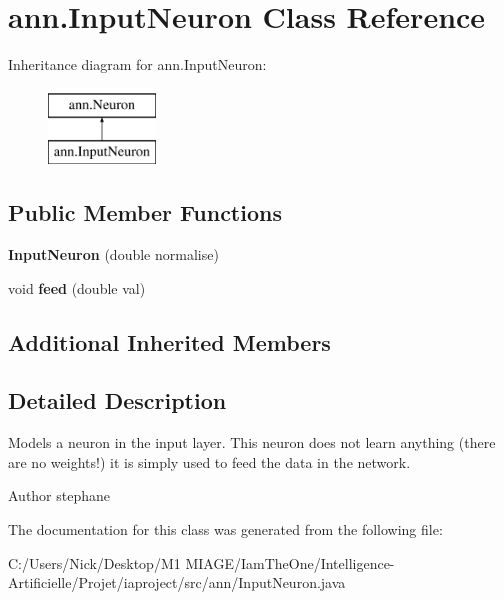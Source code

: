 \hypertarget{classann_1_1_input_neuron}{}\section{ann.\+Input\+Neuron Class Reference}
\label{classann_1_1_input_neuron}
Inheritance diagram for ann.\+Input\+Neuron\+:\begin{figure}[H]
\begin{center}
\leavevmode
\includegraphics[height=2.000000cm]{classann_1_1_input_neuron}
\end{center}
\end{figure}
\subsection*{Public Member Functions}
\begin{DoxyCompactItemize}
\item 
\mbox{\label{classann_1_1_input_neuron_aff4d145c16f3c5e6b667a739465a3866}} 
{\bfseries Input\+Neuron} (double normalise)
\item 
\mbox{\label{classann_1_1_input_neuron_a6a02b1d84db4ae32922ae59707a0c039}} 
void {\bfseries feed} (double val)
\end{DoxyCompactItemize}
\subsection*{Additional Inherited Members}


\subsection{Detailed Description}
Models a neuron in the input layer. This neuron does not learn anything (there are no weights!) it is simply used to feed the data in the network. \begin{DoxyAuthor}{Author}
stephane 
\end{DoxyAuthor}


The documentation for this class was generated from the following file\+:\begin{DoxyCompactItemize}
\item 
C\+:/\+Users/\+Nick/\+Desktop/\+M1 M\+I\+A\+G\+E/\+Iam\+The\+One/\+Intelligence-\/\+Artificielle/\+Projet/iaproject/src/ann/Input\+Neuron.\+java\end{DoxyCompactItemize}

